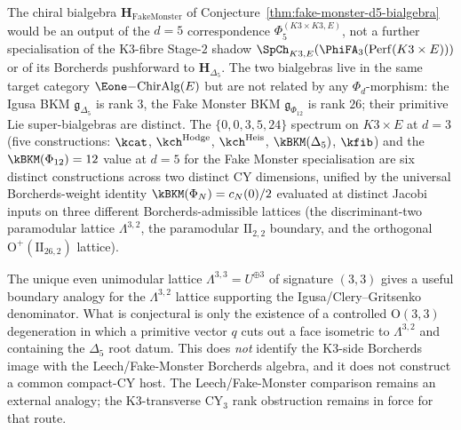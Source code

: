\begin{remark}[The $d = 5$ bialgebra is not a $\Phi_3$-specialisation]
\label{rem:d5-not-d3-specialisation}
The chiral bialgebra $\mathbf{H}_{\mathrm{FakeMonster}}$ of Conjecture~\ref{thm:fake-monster-d5-bialgebra} would be an output of the $d = 5$ correspondence $\Phi_5^{(K3 \times K3, E)}$, not a further specialisation of the K3-fibre Stage-$2$ shadow
$\SpCh_{K3,E}(\PhiFA_3(\mathrm{Perf}(K3 \times E)))$ or of its
Borcherds pushforward to $\mathbf{H}_{\Delta_5}$. The two bialgebras live in the same target category $\Eone\mathrm{-}\mathrm{ChirAlg}(E)$ but are not related by any $\Phi_d$-morphism: the Igusa BKM $\mathfrak{g}_{\Delta_5}$ is rank $3$, the Fake Monster BKM $\mathfrak{g}_{\Phi_{12}}$ is rank $26$; their primitive Lie super-bialgebras are distinct. The $\{0, 0, 3, 5, 24\}$ spectrum on $K3 \times E$ at $d = 3$ (five constructions: $\kcat$, $\kch^{\mathrm{Hodge}}$, $\kch^{\mathrm{Heis}}$, $\kBKM(\Delta_5)$, $\kfib$) and the $\kBKM(\Phi_{12}) = 12$ value at $d = 5$ for the Fake Monster specialisation are six distinct constructions across two distinct CY dimensions, unified by the universal Borcherds-weight identity $\kBKM(\Phi_N) = c_N(0)/2$ evaluated at distinct Jacobi inputs on three different Borcherds-admissible lattices (the discriminant-two paramodular lattice \(\Lambda^{3,2}\), the paramodular \(\mathrm{II}_{2,2}\) boundary, and the orthogonal \(\mathrm{O}^+(\mathrm{II}_{26,2})\) lattice).
\end{remark}

\begin{conjecture}
\label{conj:fake-monster-envelope}
\ClaimStatusConjectured
The unique even unimodular lattice $\Lambda^{3,3}=U^{\oplus 3}$ of signature $(3,3)$ gives a useful boundary analogy for the $\Lambda^{3,2}$ lattice supporting the Igusa/Clery--Gritsenko denominator. What is conjectural is only the existence of a controlled $\mathrm{O}(3,3)$ degeneration in which a primitive vector $q$ cuts out a face isometric to $\Lambda^{3,2}$ and containing the $\Delta_5$ root datum. This does \emph{not} identify the K3-side Borcherds image with the Leech/Fake-Monster Borcherds algebra, and it does not construct a common compact-CY host. The Leech/Fake-Monster comparison remains an external analogy; the K3-transverse CY$_3$ rank obstruction remains in force for that route.
\end{conjecture}

